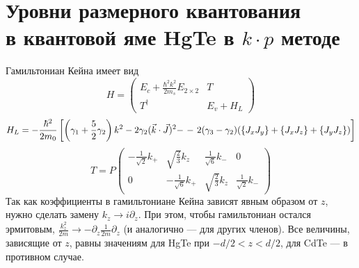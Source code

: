 \newpage
\section{Уровни размерного квантования\\ в квантовой яме HgTe в $k\cdot p$ методе}
\label{app:dim_quant}
Гамильтониан Кейна имеет вид
\begin{equation}
    \label{kane_ham}
    H = \begin{pmatrix}
                E_c + \frac{\hbar^2 k^2}{2m_s}E_{2\times 2} & T \\
                T^\dagger & E_v + H_{L}
        \end{pmatrix}
\end{equation}
\begin{equation*}
    H_L = -\frac{\hbar^2}{2m_0}\left[
            \left(\gamma_1 + \frac{5}{2}\gamma_2\right)k^2 -
            2\gamma_2(\vec{k} \cdot \vec{J})^2 - \right. 
            - \left.2(\gamma_3 - \gamma_2)(\{J_x J_y\} + \{J_x J_z\} + \{J_y J_z\})
            \vphantom{\frac{1}{2}}\right]
\end{equation*}
\begin{equation*}
    T = P\begin{pmatrix}
           -\frac{1}{\sqrt{2}}k_{+} & \sqrt{\frac{2}{3}}k_z  
                    & \frac{1}{\sqrt{6}} k_{-} & 0 \\
            0 & -\frac{1}{\sqrt{6}} k_{+} 
                    & \sqrt{\frac{2}{3}}k_z & \frac{1}{\sqrt{2}} k_{-} 
         \end{pmatrix}
\end{equation*}
Так как
коэффициенты в гамильтониане Кейна зависят явным образом от $z$, нужно сделать замену
$k_z \to i\partial_z$. При этом, чтобы гамильтониан остался эрмитовым,
$\frac{k_z^2}{2m} \to -\partial_z \frac{1}{2m} \partial_z$ (и аналогично --- для других
членов). Все величины, зависящие от $z$, равны значениям для HgTe при $-d/2 < z < d/2$,
для CdTe --- в противном случае.

